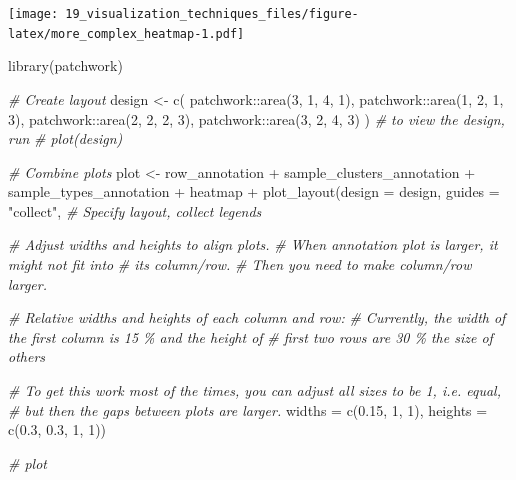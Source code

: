 \documentclass[
]{book}
\newenvironment{Shaded}{\begin{snugshade}}{\end{snugshade}}
\newcommand{\AttributeTok}[1]{\textcolor[rgb]{0.77,0.63,0.00}{#1}}
\newcommand{\CommentTok}[1]{\textcolor[rgb]{0.56,0.35,0.01}{\textit{#1}}}
\newcommand{\DecValTok}[1]{\textcolor[rgb]{0.00,0.00,0.81}{#1}}
\newcommand{\FloatTok}[1]{\textcolor[rgb]{0.00,0.00,0.81}{#1}}
\newcommand{\FunctionTok}[1]{\textcolor[rgb]{0.00,0.00,0.00}{#1}}
\newcommand{\NormalTok}[1]{#1}
\newcommand{\OtherTok}[1]{\textcolor[rgb]{0.56,0.35,0.01}{#1}}
\newcommand{\SpecialCharTok}[1]{\textcolor[rgb]{0.00,0.00,0.00}{#1}}
\newcommand{\StringTok}[1]{\textcolor[rgb]{0.31,0.60,0.02}{#1}}
\begin{document}
\texttt{[image: 19\_visualization\_techniques\_files/figure-latex/more\_complex\_heatmap-1.pdf]}

\begin{Shaded}
\begin{Highlighting}[]
\FunctionTok{library}\NormalTok{(patchwork)}

\CommentTok{\# Create layout}
\NormalTok{design }\OtherTok{\textless{}{-}} \FunctionTok{c}\NormalTok{(}
\NormalTok{  patchwork}\SpecialCharTok{::}\FunctionTok{area}\NormalTok{(}\DecValTok{3}\NormalTok{, }\DecValTok{1}\NormalTok{, }\DecValTok{4}\NormalTok{, }\DecValTok{1}\NormalTok{),}
\NormalTok{  patchwork}\SpecialCharTok{::}\FunctionTok{area}\NormalTok{(}\DecValTok{1}\NormalTok{, }\DecValTok{2}\NormalTok{, }\DecValTok{1}\NormalTok{, }\DecValTok{3}\NormalTok{),}
\NormalTok{  patchwork}\SpecialCharTok{::}\FunctionTok{area}\NormalTok{(}\DecValTok{2}\NormalTok{, }\DecValTok{2}\NormalTok{, }\DecValTok{2}\NormalTok{, }\DecValTok{3}\NormalTok{),}
\NormalTok{  patchwork}\SpecialCharTok{::}\FunctionTok{area}\NormalTok{(}\DecValTok{3}\NormalTok{, }\DecValTok{2}\NormalTok{, }\DecValTok{4}\NormalTok{, }\DecValTok{3}\NormalTok{)}
\NormalTok{)}
\CommentTok{\# to view the design, run}
\CommentTok{\# plot(design)}

\CommentTok{\# Combine plots}
\NormalTok{plot }\OtherTok{\textless{}{-}}\NormalTok{ row\_annotation }\SpecialCharTok{+}\NormalTok{ sample\_clusters\_annotation }\SpecialCharTok{+}
\NormalTok{                         sample\_types\_annotation }\SpecialCharTok{+}
\NormalTok{             heatmap  }\SpecialCharTok{+}
    \FunctionTok{plot\_layout}\NormalTok{(}\AttributeTok{design =}\NormalTok{ design, }\AttributeTok{guides =} \StringTok{"collect"}\NormalTok{,}
                \CommentTok{\# Specify layout, collect legends}
                
                \CommentTok{\# Adjust widths and heights to align plots.}
                \CommentTok{\# When annotation plot is larger, it might not fit into}
        \CommentTok{\# its column/row.}
                \CommentTok{\# Then you need to make column/row larger.}
                
                \CommentTok{\# Relative widths and heights of each column and row:}
                \CommentTok{\# Currently, the width of the first column is 15 \% and the height of}
                \CommentTok{\# first two rows are 30 \% the size of others}
                
                \CommentTok{\# To get this work most of the times, you can adjust all sizes to be 1, i.e. equal, }
                \CommentTok{\# but then the gaps between plots are larger.}
                \AttributeTok{widths =} \FunctionTok{c}\NormalTok{(}\FloatTok{0.15}\NormalTok{, }\DecValTok{1}\NormalTok{, }\DecValTok{1}\NormalTok{),}
                \AttributeTok{heights =} \FunctionTok{c}\NormalTok{(}\FloatTok{0.3}\NormalTok{, }\FloatTok{0.3}\NormalTok{, }\DecValTok{1}\NormalTok{, }\DecValTok{1}\NormalTok{))}

\CommentTok{\# plot}
\end{Highlighting}
\end{Shaded}
\end{document}
